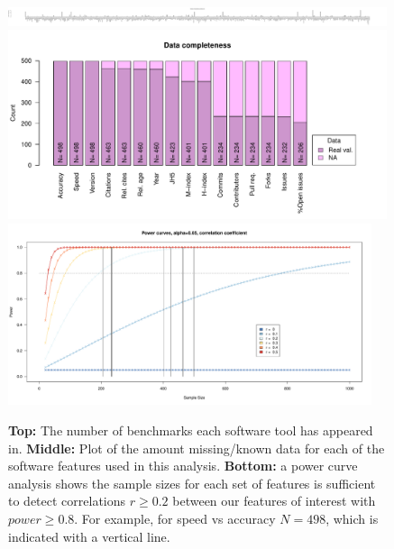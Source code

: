 \documentclass[fleqn,10pt]{SelfArx} %
\def\numTools{498}
\begin{document}

\clearpage
\newpage

\begin{figure}[H]
\centering
\includegraphics[width=0.99\textwidth]{numberBenchmarksPerToolBarplot.pdf}\\
\includegraphics[width=0.99\textwidth]{numberRealValueFeaturesBarplot.pdf}\\
\includegraphics[width=0.95\textwidth]{powerCurves.pdf}

\caption{ {\bf Top:} The number of benchmarks each software tool has
  appeared in. {\bf Middle:} Plot of the amount missing/known data for
  each of the software features used in this analysis.  {\bf Bottom:}
  a power curve analysis shows the sample sizes for each set of
  features is sufficient to detect correlations $r\ge0.2$ between our
  features of interest with $power \ge 0.8$. For example, for speed vs
  accuracy $N=\numTools$, which is indicated with a vertical line.  }
\label{fig:numBenchmarks}
\end{figure}
\end{document}
